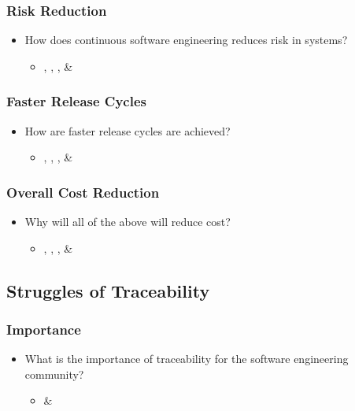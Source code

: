 \documentclass[12pt,a4paper]{article}
\begin{document}
		\subsubsection{Risk Reduction}
		\begin{itemize}[noitemsep]
			\item How does continuous software engineering reduces risk in systems?
			\begin{itemize}
				\item \cite{atkinson_edwards_2018}, \cite{bosch_2014}, \cite{stackify_2018}, \& \cite{stahl_2017} \cite{stackify_2018}
			\end{itemize}
		\end{itemize}
		\subsubsection{Faster Release Cycles}
		\begin{itemize}[noitemsep]
			\item How are faster release cycles are achieved?
			\begin{itemize}
				\item \cite{atkinson_edwards_2018}, \cite{bosch_2014}, \cite{stackify_2018}, \& \cite{stahl_2017} \cite{stackify_2018}
			\end{itemize}
		\end{itemize}
		\subsubsection{Overall Cost Reduction}
		\begin{itemize}[noitemsep]
			\item Why will all of the above will reduce cost?
			\begin{itemize}
				\item \cite{atkinson_edwards_2018}, \cite{bosch_2014}, \cite{stackify_2018}, \& \cite{stahl_2017} \cite{stackify_2018}
			\end{itemize}
		\end{itemize}
		
	\subsection{Struggles of Traceability}
		\subsubsection{Importance}
		\begin{itemize}[noitemsep]
			\item What is the importance of traceability for the software engineering community?
			\begin{itemize}
				\item \cite{stahl_2017} \& \cite{stahl_hallen_bosch_2016}
			\end{itemize}
		\end{itemize}
\end{document}
